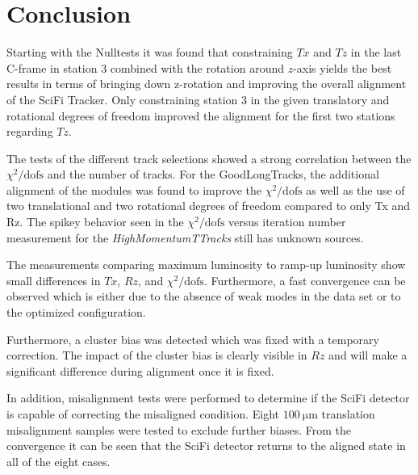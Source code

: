 \chapter{Conclusion}

Starting with the Nulltests it was found that constraining $Tx$ and $Tz$ in the last C-frame in station 3 combined with the rotation around $z$-axis yields the best results in terms of bringing down z-rotation and improving the overall alignment of the SciFi Tracker.
Only constraining station 3 in the given translatory and rotational degrees of freedom improved the alignment for the first two stations regarding $Tz$.

The tests of the different track selections showed a strong correlation between the $\chi^2 / \text{dofs}$ and the number of tracks.
For the GoodLongTracks, the additional alignment of the modules was found to improve the $\chi^2 / \text{dofs}$ as well as the use of two translational and two rotational degrees of freedom compared to only Tx and Rz.
The spikey behavior seen in the $\chi^2 / \text{dofs}$ versus iteration number measurement for the \textit{HighMomentumTTracks} still has unknown sources.

The measurements comparing maximum luminosity to ramp-up luminosity show small differences in $Tx$, $Rz$, and $\chi^2 / \text{dofs}$. Furthermore, a fast convergence can be observed which is either due to the absence of weak modes in the data set or to the optimized configuration.

Furthermore, a cluster bias was detected which was fixed with a temporary correction. The impact of the cluster bias is clearly visible in $Rz$ and will make a significant difference during alignment once it is fixed.

In addition, misalignment tests were performed to determine if the SciFi detector is capable of correcting the misaligned condition. Eight $\SI{100}{\micro\metre}$ translation misalignment samples were tested to exclude further biases. From the convergence it can be seen that the SciFi detector returns to the aligned state in all of the eight cases.
